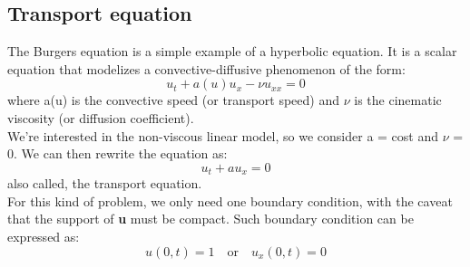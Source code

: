 \documentclass{report}
\begin{document}
\subsection*{Transport equation}

The Burgers equation is a simple example of a hyperbolic equation. It is a scalar equation that modelizes a convective-diffusive phenomenon
of the form:
\begin{equation*}
    u_t + a(u)u_x - \nu u_{xx} = 0
\end{equation*}
where a(u) is the convective speed (or transport speed) and $\nu$ is the cinematic viscosity (or diffusion coefficient).\\
We're interested in the non-viscous linear model, so we consider a = cost and $\nu$ = 0. We can then rewrite the equation as:
\begin{equation}
    u_t + au_x = 0
    \label{hyp}
\end{equation}
also called, the transport equation.\\
For this kind of problem, we only need one boundary condition, with the caveat that the support of \textbf{u} must be compact. Such boundary condition can be expressed as:
\begin{equation*}
    u(0, t) = 1 \quad \textrm{or} \quad u_x(0, t) = 0
\end{equation*}

\end{document}
